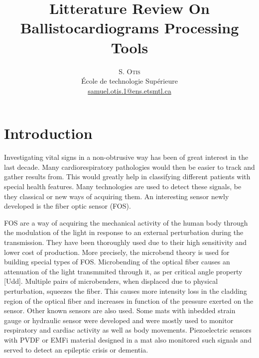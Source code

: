 \documentclass[twoside,onecolumn]{article}
\title{Litterature Review On Ballistocardiograms Processing Tools} %
\author{%
\textsc{S. Otis}\\[1ex]%
\normalsize École de technologie Supérieure \\ %
\normalsize \href{mailto:samuel.otis.1@ens.etsmtl.ca}{samuel.otis.1@ens.etsmtl.ca}
}
\begin{document}

\maketitle
\section{Introduction}
Investigating vital signs in a non-obtrusive way has been of great interest in the last decade. Many cardiorespiratory pathologies would then be easier to track and gather results from. This would greatly help in classifying different patients with special health features. Many technologies are used to detect these signals, be they classical or new ways of acquiring them. An interesting sensor newly developed is the fiber optic sensor (FOS).

FOS are a way of acquiring the mechanical activity of the human body through the modulation of the light in response to an external perturbation during the transmission. They have been thoroughly used due to their high sensitivity and lower cost of production. More precisely, the microbend theory is used for building special types of FOS. Microbending of the optical fiber causes an attenuation of the light transmmited through it, as per critical angle property [Udd]. Multiple pairs of microbenders, when displaced due to physical perturbation, squeezes the fiber. This causes more intensity loss in the cladding region of the optical fiber and increases in function of the pressure exerted on the sensor. 
Other known sensors are also used. Some mats with inbedded strain gauge or hydraulic sensor were developed and were mostly used to monitor respiratory and cardiac activity as well as body movements.  Piezoelectric sensors with PVDF or EMFi material designed in a mat also monitored such signals and served to detect an epileptic crisis or dementia.
\end{document}
